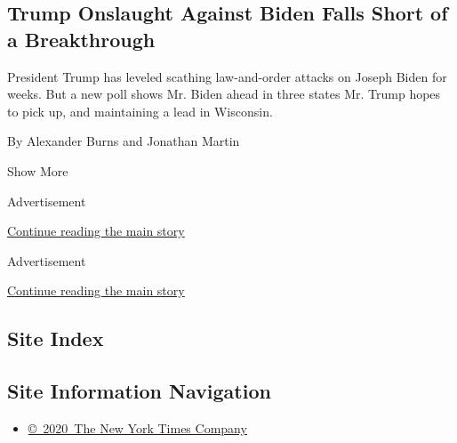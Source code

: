 \begin{enumerate}
  \hypertarget{trump-onslaught-against-biden-falls-short-of-a-breakthrough}{%
  \subsection{Trump Onslaught Against Biden Falls Short of a
  Breakthrough}\label{trump-onslaught-against-biden-falls-short-of-a-breakthrough}}

  President Trump has leveled scathing law-and-order attacks on Joseph
  Biden for weeks. But a new poll shows Mr. Biden ahead in three states
  Mr. Trump hopes to pick up, and maintaining a lead in Wisconsin.

  By Alexander Burns and Jonathan Martin
\end{enumerate}

Show More

Advertisement

\protect\hyperlink{after-mid2}{Continue reading the main story}

Advertisement

\protect\hyperlink{after-mktg}{Continue reading the main story}

\hypertarget{site-index}{%
\subsection{Site Index}\label{site-index}}

\hypertarget{site-information-navigation}{%
\subsection{Site Information
Navigation}\label{site-information-navigation}}

\begin{itemize}
\tightlist
\item
  \href{https://help.nytimes3xbfgragh.onion/hc/en-us/articles/115014792127-Copyright-notice}{©~2020~The
  New York Times Company}
\end{itemize}

